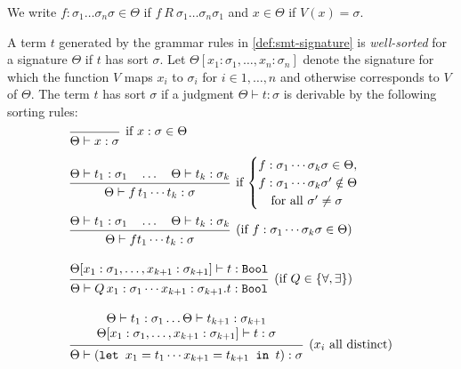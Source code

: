\begin{notation}
We write $f: \sigma_1\dots\sigma_n\sigma \in \Theta$ if $f~R~\sigma_1 \dots \sigma_n \sigma_1$ and $x \in \Theta$ if $V(x) = \sigma$.
\end{notation}

\begin{definition}
A term $t$ generated by the grammar rules in \cref{def:smt-signature} is \emph{well-sorted} for a signature $\Theta$ if $t$ has sort $\sigma$.  
Let $\Theta[x_1 : \sigma_1, \dots, x_n : \sigma_n]$ denote the signature for which the function $V$ maps $x_i$ to $\sigma_i$ for $i \in 1,\dots,n$ and otherwise corresponds to $V$ of $\Theta$.  
The term $t$ has sort $\sigma$ if a judgment $\Theta \vdash t : \sigma$ \index{$\vdash$} is derivable by the following sorting rules:
\[
\begin{array}{l}
\begin{prooftree}
\infer0[if~$x : \sigma \in \Theta$]{\Theta \vdash x : \sigma}
\end{prooftree}
\\[2em]
\begin{prooftree}
\hypo{\Theta \vdash t_1 : \sigma_1 \quad \dots \quad \Theta \vdash t_k : \sigma_k}
\infer1[if $\begin{cases} f : \sigma_1 \cdots \sigma_k \sigma \in \Theta, \\ f : \sigma_1 \cdots \sigma_k \sigma' \notin \Theta\\ \quad \text{for all } \sigma' \neq \sigma \end{cases}$]{\Theta \vdash f\, t_1 \cdots t_k : \sigma}
\end{prooftree}
\\[2em]
\begin{prooftree}
\hypo{\Theta \vdash t_1 : \sigma_1 \quad \dots \quad \Theta \vdash t_k : \sigma_k}
\infer1[(if $f : \sigma_1 \cdots \sigma_k \sigma \in \Theta$)]{\Theta \vdash f t_1 \cdots t_k : \sigma}
\end{prooftree}
\\[2em]
\begin{prooftree}
\hypo{\Theta[x_1 : \sigma_1, \dots, x_{k+1} : \sigma_{k+1}] \vdash t : \kw{Bool}}
\infer1[(if $Q \in \{\forall, \exists\}$)]{\Theta \vdash Q\, x_1 : \sigma_1 \cdots x_{k+1} : \sigma_{k+1} . t : \kw{Bool}}
\end{prooftree}
\\[2em]
\begin{prooftree}
\hypo{
  \begin{matrix}
    \Theta \vdash t_1 : \sigma_1 \dots  \Theta \vdash t_{k+1} : \sigma_{k+1}  \\
    \Theta[x_1 : \sigma_1, \dots, x_{k+1} : \sigma_{k+1}] \vdash t : \sigma
  \end{matrix}
}
\infer1[($x_i$ all distinct)]{\Theta \vdash (\kw{let } x_1 = t_1 \cdots x_{k+1} = t_{k+1} \kw{ in } t) : \sigma}
\end{prooftree}
\end{array}
\]
\end{definition}



